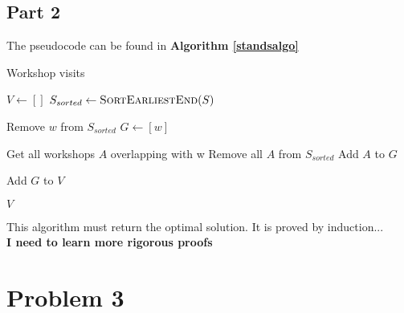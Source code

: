 \documentclass{article}
\begin{document}
\subsection{Part 2}

The pseudocode can be found in \textbf{Algorithm \ref{standsalgo}}

\begin{algorithm}
    \caption{Workshop visits}
    \label{standsalgo}
    \begin{algorithmic}
         
            \State $V \gets []$     
            \State $S_{sorted} \gets \Call{SortEarliestEnd}{S}$
            \item[]
                \State Remove $w$ from $S_{sorted}$
                \State $G \gets [w]$
                \item[]
                \State Get all workshops $A$ overlapping with w
                \State Remove all $A$ from $S_{sorted}$
                \State Add $A$ to $G$
                \item[]
                \State Add $G$ to $V$
            \EndFor

            \State \Return $V$
        \EndFunction
    \end{algorithmic}
\end{algorithm}

This algorithm must return the optimal solution.
It is proved by induction... \\
\textbf{I need to learn more rigorous proofs}

\pagebreak
\section{Problem 3}
\end{document}
